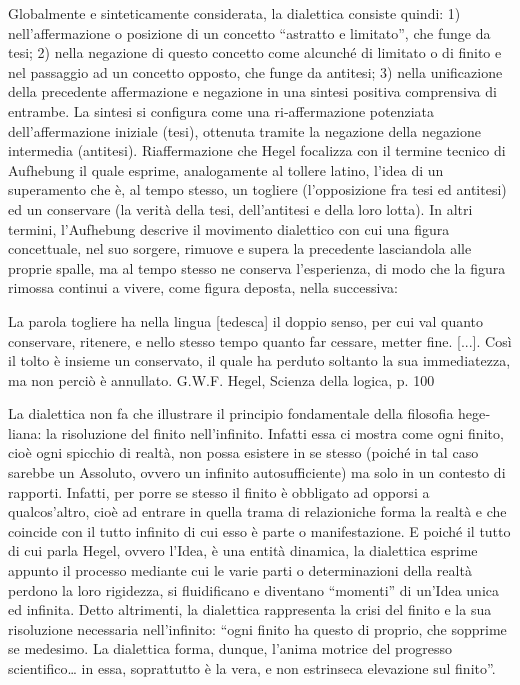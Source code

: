 \documentclass[a4paper,12pt,oneside,openany]{book}%
\begin{document}
Globalmente e sintetica­mente considerata, la dialettica consiste quindi: 1) nell’affermazione o posizione di un concetto “astratto e limitato”, che funge da tesi; 2) nella negazione di questo concetto come alcunché di limitato o di finito e nel passaggio ad un concetto opposto, che funge da antitesi; 3) nella unificazione della precedente affermazione e negazione in una sintesi positiva comprensiva di entrambe. La sintesi si configura come una ri‑affermazione potenziata dell’affermazione iniziale (tesi), ottenuta tramite la negazione della negazione intermedia (antitesi). Riaffermazione che Hegel focalizza con il termine tecnico di Aufhebung il quale esprime, analogamente al tollere latino, l’idea di un superamento che è, al tempo stesso, un togliere (l’opposizione fra tesi ed antitesi) ed un conservare (la verità della tesi, dell’antitesi e della loro lotta). In altri termini, l’Aufhebung descrive il movimento dialettico con cui una figura concettuale, nel suo sorgere, rimuove e supera la precedente lasciandola alle proprie spalle, ma al tempo stesso ne conserva l’esperienza, di modo che la figura rimossa continui a vivere, come figura deposta, nella successiva:

La parola togliere ha nella lingua [tedesca] il doppio senso, per cui val quanto conservare, ritenere, e nello stesso tempo quanto far cessare, metter fine. [...]. Così il tolto è insieme un conservato, il quale ha perduto soltanto la sua immediatezza, ma non perciò è annullato.                                                     G.W.F. Hegel, Scienza della logica, p. 100

La dialettica non fa che illustrare il principio fondamentale della filosofia hege­liana: la risoluzione del finito nell’infinito. Infatti essa ci mostra come ogni finito, cioè ogni spicchio di realtà, non possa esistere in se stesso (poiché in tal caso sarebbe un Assoluto, ovvero un infinito autosufficiente) ma solo in un contesto di rapporti. Infatti, per porre se stesso il finito è obbligato ad opporsi a qualcos’altro, cioè ad entrare in quella trama di relazioniche forma la realtà e che coincide con il tutto infinito di cui esso è parte o manifestazione. E poiché il tutto di cui parla Hegel, ovvero l’Idea, è una entità dinamica, la dialettica esprime appunto il processo mediante cui le varie parti o determinazioni della realtà perdono la loro rigidezza, si fluidificano e diventano “momenti” di un’Idea unica ed infinita. Detto altrimenti, la dialettica rappresenta la crisi del finito e la sua risoluzione necessaria nell’infinito: “ogni finito ha questo di proprio, che sopprime se medesimo. La dialettica forma, dunque, l’anima motrice del progresso scientifico… in essa, soprattutto è la vera, e non estrinseca elevazione sul finito”.
\end{document}
